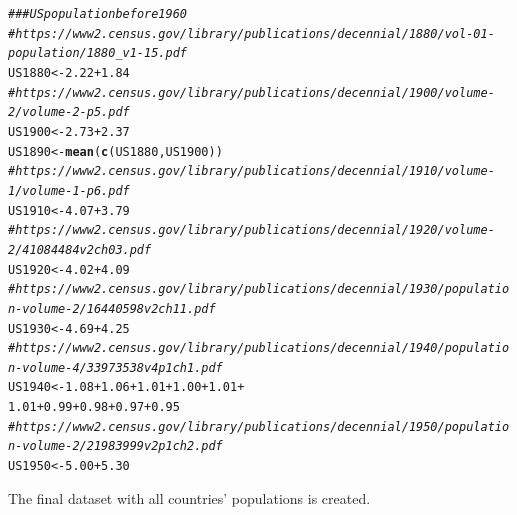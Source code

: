 \documentclass[11pt]{article}\usepackage[]{graphicx}\usepackage[]{color}
\makeatletter
\newcommand{\hlnum}[1]{\textcolor[rgb]{0.686,0.059,0.569}{#1}}%
\newcommand{\hlcom}[1]{\textcolor[rgb]{0.678,0.584,0.686}{\textit{#1}}}%
\newcommand{\hlopt}[1]{\textcolor[rgb]{0,0,0}{#1}}%
\newcommand{\hlstd}[1]{\textcolor[rgb]{0.345,0.345,0.345}{#1}}%
\newcommand{\hlkwb}[1]{\textcolor[rgb]{0.69,0.353,0.396}{#1}}%
\newcommand{\hlkwd}[1]{\textcolor[rgb]{0.737,0.353,0.396}{\textbf{#1}}}%
\newenvironment{kframe}{%
 \def\at@end@of@kframe{}%
 \ifinner\ifhmode%
  \def\at@end@of@kframe{\end{minipage}}%
  \begin{minipage}{\columnwidth}%
 \fi\fi%
 \def\FrameCommand##1{\hskip\@totalleftmargin \hskip-\fboxsep
 \colorbox{shadecolor}{##1}\hskip-\fboxsep
     \hskip-\linewidth \hskip-\@totalleftmargin \hskip\columnwidth}%
 \MakeFramed {\advance\hsize-\width
   \@totalleftmargin\z@ \linewidth\hsize
   \@setminipage}}%
 {\par\unskip\endMakeFramed%
 \at@end@of@kframe}
\newenvironment{knitrout}{}{} %
\makeatother
\begin{document}
\begin{knitrout}
\begin{kframe}
\begin{alltt}
\hlcom{### US population before 1960}
\hlcom{#https://www2.census.gov/library/publications/decennial/1880/vol-01-population/1880_v1-15.pdf}
\hlstd{US1880} \hlkwb{<-} \hlnum{2.22} \hlopt{+} \hlnum{1.84}
\hlcom{#https://www2.census.gov/library/publications/decennial/1900/volume-2/volume-2-p5.pdf}
\hlstd{US1900} \hlkwb{<-} \hlnum{2.73} \hlopt{+} \hlnum{2.37}
\hlstd{US1890} \hlkwb{<-} \hlkwd{mean}\hlstd{(}\hlkwd{c}\hlstd{(US1880,US1900))}
\hlcom{#https://www2.census.gov/library/publications/decennial/1910/volume-1/volume-1-p6.pdf}
\hlstd{US1910} \hlkwb{<-} \hlnum{4.07} \hlopt{+} \hlnum{3.79}
\hlcom{#https://www2.census.gov/library/publications/decennial/1920/volume-2/41084484v2ch03.pdf}
\hlstd{US1920} \hlkwb{<-} \hlnum{4.02} \hlopt{+} \hlnum{4.09}
\hlcom{#https://www2.census.gov/library/publications/decennial/1930/population-volume-2/16440598v2ch11.pdf}
\hlstd{US1930} \hlkwb{<-} \hlnum{4.69} \hlopt{+} \hlnum{4.25}
\hlcom{#https://www2.census.gov/library/publications/decennial/1940/population-volume-4/33973538v4p1ch1.pdf}
\hlstd{US1940} \hlkwb{<-} \hlnum{1.08} \hlopt{+} \hlnum{1.06} \hlopt{+} \hlnum{1.01} \hlopt{+} \hlnum{1.00} \hlopt{+} \hlnum{1.01} \hlopt{+}
  \hlnum{1.01} \hlopt{+} \hlnum{0.99} \hlopt{+} \hlnum{0.98} \hlopt{+} \hlnum{0.97} \hlopt{+} \hlnum{0.95}
\hlcom{#https://www2.census.gov/library/publications/decennial/1950/population-volume-2/21983999v2p1ch2.pdf}
\hlstd{US1950} \hlkwb{<-} \hlnum{5.00} \hlopt{+} \hlnum{5.30}
\end{alltt}
\end{kframe}
\end{knitrout}


The final dataset with all countries' populations is created. 
\end{document}
